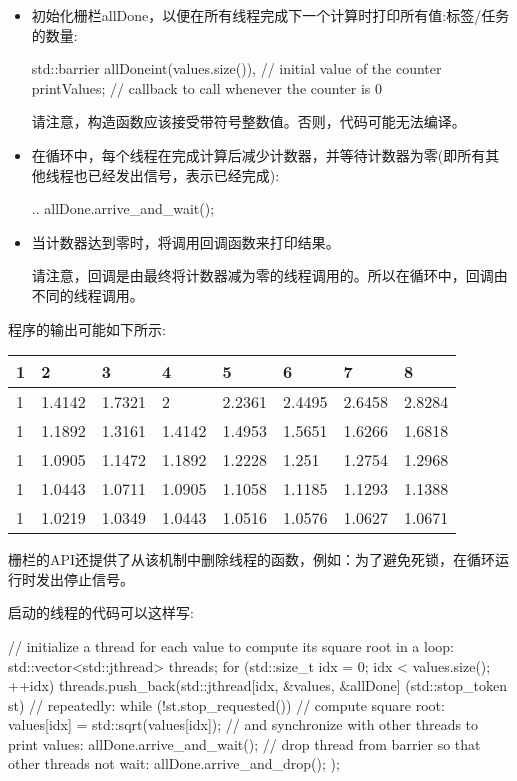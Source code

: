 \begin{itemize}
\item 
初始化栅栏allDone，以便在所有线程完成下一个计算时打印所有值:标签/任务的数量:

\begin{cpp}
std::barrier allDone{int(values.size()), // initial value of the counter
					 printValues}; // callback to call whenever the counter is 0
\end{cpp}

请注意，构造函数应该接受带符号整数值。否则，代码可能无法编译。

\item 
在循环中，每个线程在完成计算后减少计数器，并等待计数器为零(即所有其他线程也已经发出信号，表示已经完成):

\begin{cpp}
..
allDone.arrive_and_wait();
\end{cpp}

\item 
当计数器达到零时，将调用回调函数来打印结果。

请注意，回调是由最终将计数器减为零的线程调用的。所以在循环中，回调由不同的线程调用。
\end{itemize}

程序的输出可能如下所示:

\begin{longtable}[c]{llllllll}
1 & 2      & 3      & 4      & 5      & 6      & 7      & 8      \\
\endfirsthead
%
\endhead
%
1 & 1.4142 & 1.7321 & 2      & 2.2361 & 2.4495 & 2.6458 & 2.8284 \\
1 & 1.1892 & 1.3161 & 1.4142 & 1.4953 & 1.5651 & 1.6266 & 1.6818 \\
1 & 1.0905 & 1.1472 & 1.1892 & 1.2228 & 1.251  & 1.2754 & 1.2968 \\
1 & 1.0443 & 1.0711 & 1.0905 & 1.1058 & 1.1185 & 1.1293 & 1.1388 \\
1 & 1.0219 & 1.0349 & 1.0443 & 1.0516 & 1.0576 & 1.0627 & 1.0671
\end{longtable}

栅栏的API还提供了从该机制中删除线程的函数，例如：为了避免死锁，在循环运行时发出停止信号。

启动的线程的代码可以这样写:

\begin{cpp}
// initialize a thread for each value to compute its square root in a loop:
std::vector<std::jthread> threads;
for (std::size_t idx = 0; idx < values.size(); ++idx) {
	threads.push_back(std::jthread{[idx, &values, &allDone] (std::stop_token st) {
									// repeatedly:
									while (!st.stop_requested()) {
										// compute square root:
										values[idx] = std::sqrt(values[idx]);
										// and synchronize with other threads to print values:
										allDone.arrive_and_wait();
									}
									// drop thread from barrier so that other threads not wait:
									allDone.arrive_and_drop();
							}});
}
\end{cpp}

